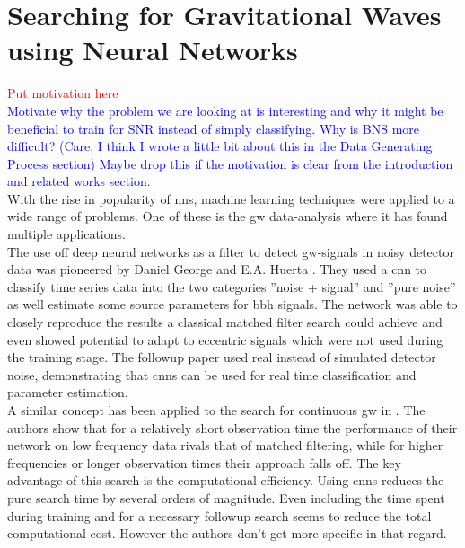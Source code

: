 \section{Searching for Gravitational Waves using Neural Networks}\label{sec:related_works}
\textcolor{red}{Put motivation here}\\
\textcolor{blue}{Motivate why the problem we are looking at is interesting and why it might be beneficial to train for SNR instead of simply classifying. Why is BNS more difficult? (Care, I think I wrote a little bit about this in the Data Generating Process section) Maybe drop this if the motivation is clear from the introduction and related works section.}\\
With the rise in popularity of \gls{nns}, machine learning techniques were applied to a wide range of problems. One of these is the \gls{gw} data-analysis where it has found multiple applications.\\
The use off deep neural networks as a filter to detect \gls{gw}-signals in noisy detector data was pioneered by Daniel George and E.A. Huerta \cite{original_deep_filtering}. They used a \gls{cnn} to classify time series data into the two categories ''noise + signal'' and ''pure noise'' as well estimate some source parameters for \gls{bbh} signals. The network was able to closely reproduce the results a classical matched filter search could achieve and even showed potential to adapt to eccentric signals which were not used during the training stage. The followup paper \cite{huerta_parameter_estimation} used real instead of simulated detector noise, demonstrating that \gls{cnns} can be used for real time classification and parameter estimation.\\
A similar concept has been applied to the search for continuous \gls{gw} in \cite{paper_christoph}. The authors show that for a relatively short observation time the performance of their network on low frequency data rivals that of matched filtering, while for higher frequencies or longer observation times their approach falls off. The key advantage of this search is the computational efficiency. Using \gls{cnns} reduces the pure search time by several orders of magnitude. Even including the time spent during training and for a necessary followup search seems to reduce the total computational cost. However the authors don't get more specific in that regard.\\
